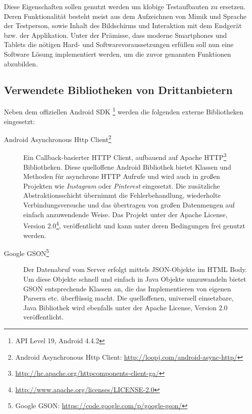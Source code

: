 Diese Eigenschaften sollen genutzt werden um klobige Testaufbauten zu ersetzen. Deren Funktionalität besteht meist aus dem Aufzeichnen von Mimik und Sprache der Testperson, sowie Inhalt des Bildschirms und Interaktion mit dem Endgerät bzw. der Applikation.
Unter der Prämisse, dass moderne Smartphones und Tablets die nötigen Hard- und Softwarevoraussetzungen erfüllen soll nun eine Software Lösung implementiert werden, um die zuvor genannten Funktionen abzubilden.


\subsection{Verwendete Bibliotheken von Drittanbietern}
Neben dem offiziellen Android SDK \footnote{API Level 19, Android 4.4.2} werden die folgenden externe Bibliotheken eingesetzt:
\begin{description}
	\item[Android Asynchronous Http Client\footnote{Android Asynchronous Http Client: \url{http://loopj.com/android-async-http/}}] 
	Ein Callback-basierter HTTP Client, aufbauend auf Apache HTTP\footnote{\url{http://hc.apache.org/httpcomponents-client-ga/}} Bibliotheken. Diese quelloffene Android Bibliothek bietet Klassen und Methoden für asynchrone HTTP Aufrufe und wird auch in großen Projekten wie \emph{Instagram} oder \emph{Pinterest} eingesetzt. Die zusätzliche Abstraktionsschicht übernimmt die Fehlerbehandlung, wiederholte Verbindungsversuche und das übertragen von großen Datenmengen auf einfach anzuwendende Weise. Das Projekt unter der Apache License, Version 2.0\footnote{\url{http://www.apache.org/licenses/LICENSE-2.0}}, veröffentlicht und kann unter deren Bedingungen frei genutzt werden.
	\item[Google GSON\footnote{Google GSON: \url{https://code.google.com/p/google-gson/}}]
	Der Datenabruf vom Server erfolgt mittels \ac{JSON}-Objekte im HTML Body. Um diese Objekte schnell und einfach in Java Objekte umzuwandeln bietet GSON entsprechende Klassen an, die das Implementieren von eigenen Parsern etc. überflüssig macht.
	Die quelloffenen, universell einsetzbare, Java Bibliothek wird ebenfalls unter der Apache License, Version 2.0 veröffentlicht.
\end{description}


